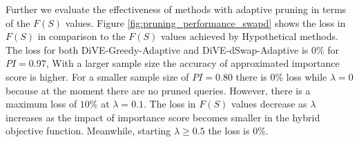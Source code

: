 Further we evaluate the effectiveness of methods with adaptive pruning in terms of the $F\left(S\right)$ values. 
Figure \ref{fig:pruning_performance_swapd} shows the loss in $F\left(S\right)$ in comparison to the $F\left(S\right)$ values achieved by Hypothetical methods. The loss for both DiVE-Greedy-Adaptive and DiVE-dSwap-Adaptive is $0\%$ for $PI=0.97$, With a larger sample size the accuracy of approximated importance score is higher. For a smaller sample size of $PI=0.80$ there is 0\% loss while $\lambda = 0$ because at the moment there are no pruned queries. However, there is a maximum loss of $10\%$ at $\lambda= 0.1$. The loss in $F\left(S\right)$ values decrease as $\lambda$ increases as the impact of importance score becomes smaller in the hybrid objective function. Meanwhile, starting $\lambda \geq 0.5$ the loss is 0\%.


